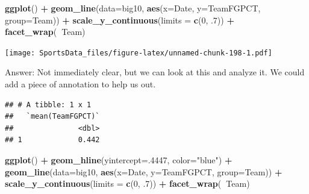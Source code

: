 \documentclass[
]{book}
\newenvironment{Shaded}{\begin{snugshade}}{\end{snugshade}}
\newcommand{\DataTypeTok}[1]{\textcolor[rgb]{0.13,0.29,0.53}{#1}}
\newcommand{\DecValTok}[1]{\textcolor[rgb]{0.00,0.00,0.81}{#1}}
\newcommand{\FloatTok}[1]{\textcolor[rgb]{0.00,0.00,0.81}{#1}}
\newcommand{\KeywordTok}[1]{\textcolor[rgb]{0.13,0.29,0.53}{\textbf{#1}}}
\newcommand{\NormalTok}[1]{#1}
\newcommand{\OperatorTok}[1]{\textcolor[rgb]{0.81,0.36,0.00}{\textbf{#1}}}
\newcommand{\StringTok}[1]{\textcolor[rgb]{0.31,0.60,0.02}{#1}}
\begin{document}
\begin{Shaded}
\begin{Highlighting}[]
\KeywordTok{ggplot}\NormalTok{() }\OperatorTok{+}\StringTok{ }\KeywordTok{geom_line}\NormalTok{(}\DataTypeTok{data=}\NormalTok{big10, }\KeywordTok{aes}\NormalTok{(}\DataTypeTok{x=}\NormalTok{Date, }\DataTypeTok{y=}\NormalTok{TeamFGPCT, }\DataTypeTok{group=}\NormalTok{Team)) }\OperatorTok{+}\StringTok{ }\KeywordTok{scale_y_continuous}\NormalTok{(}\DataTypeTok{limits =} \KeywordTok{c}\NormalTok{(}\DecValTok{0}\NormalTok{, }\FloatTok{.7}\NormalTok{)) }\OperatorTok{+}\StringTok{ }\KeywordTok{facet_wrap}\NormalTok{(}\OperatorTok{~}\NormalTok{Team)}
\end{Highlighting}
\end{Shaded}

\texttt{[image: SportsData\_files/figure-latex/unnamed-chunk-198-1.pdf]}

Answer: Not immediately clear, but we can look at this and analyze it. We could add a piece of annotation to help us out.

\begin{Shaded}
\end{Shaded}

\begin{verbatim}
## # A tibble: 1 x 1
##   `mean(TeamFGPCT)`
##               <dbl>
## 1             0.442
\end{verbatim}

\begin{Shaded}
\begin{Highlighting}[]
\KeywordTok{ggplot}\NormalTok{() }\OperatorTok{+}\StringTok{ }\KeywordTok{geom_hline}\NormalTok{(}\DataTypeTok{yintercept=}\NormalTok{.}\DecValTok{4447}\NormalTok{, }\DataTypeTok{color=}\StringTok{"blue"}\NormalTok{) }\OperatorTok{+}\StringTok{ }\KeywordTok{geom_line}\NormalTok{(}\DataTypeTok{data=}\NormalTok{big10, }\KeywordTok{aes}\NormalTok{(}\DataTypeTok{x=}\NormalTok{Date, }\DataTypeTok{y=}\NormalTok{TeamFGPCT, }\DataTypeTok{group=}\NormalTok{Team)) }\OperatorTok{+}\StringTok{ }\KeywordTok{scale_y_continuous}\NormalTok{(}\DataTypeTok{limits =} \KeywordTok{c}\NormalTok{(}\DecValTok{0}\NormalTok{, }\FloatTok{.7}\NormalTok{)) }\OperatorTok{+}\StringTok{ }\KeywordTok{facet_wrap}\NormalTok{(}\OperatorTok{~}\NormalTok{Team)}
\end{Highlighting}
\end{Shaded}
\end{document}
